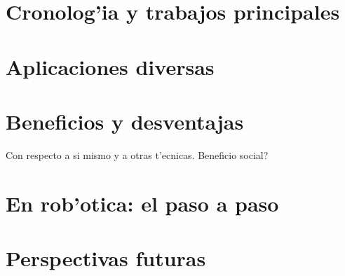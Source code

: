 \documentclass[11pt]{article}
\begin{document}
\section{Cronolog'ia y trabajos principales}
\section{Aplicaciones diversas}
\section{Beneficios y desventajas}
Con respecto a si mismo y a otras t'ecnicas. Beneficio social?
\section{En rob'otica: el paso a paso}
\section{Perspectivas futuras}



\end{document}
